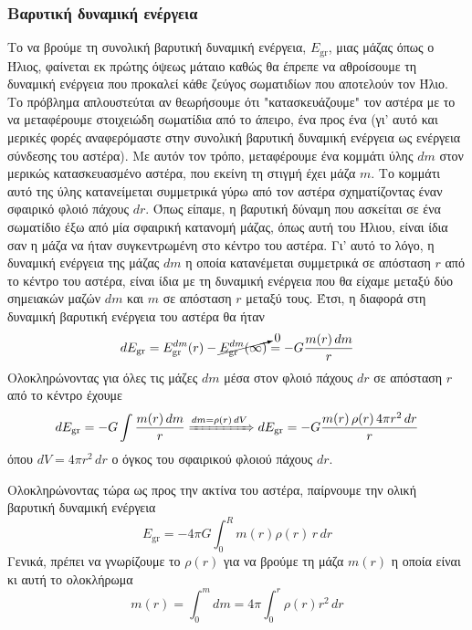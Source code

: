 \subsubsection{Βαρυτική δυναμική ενέργεια}
Το να βρούμε τη συνολική βαρυτική δυναμική ενέργεια, $E_{\text{gr}}$, μιας μάζας όπως ο Ήλιος, φαίνεται εκ πρώτης όψεως μάταιο καθώς θα έπρεπε να αθροίσουμε τη δυναμική ενέργεια που προκαλεί κάθε ζεύγος σωματιδίων που αποτελούν τον Ήλιο. Το πρόβλημα απλουστεύται αν θεωρήσουμε ότι "κατασκευάζουμε" τον αστέρα με το να μεταφέρουμε στοιχειώδη σωματίδια από το άπειρο, ένα προς ένα (γι' αυτό και μερικές φορές αναφερόμαστε στην συνολική βαρυτική δυναμική ενέργεια ως ενέργεια σύνδεσης του αστέρα). Με αυτόν τον τρόπο, μεταφέρουμε ένα κομμάτι ύλης $dm$ στον μερικώς κατασκευασμένο αστέρα, που εκείνη τη στιγμή έχει μάζα $m$. Το κομμάτι αυτό της ύλης κατανείμεται συμμετρικά γύρω από τον αστέρα σχηματίζοντας έναν σφαιρικό φλοιό πάχους $dr$. Όπως είπαμε, η βαρυτική δύναμη που ασκείται σε ένα σωματίδιο έξω από μία σφαιρική κατανομή μάζας, όπως αυτή του Ήλιου, είναι ίδια σαν η μάζα να ήταν συγκεντρωμένη στο κέντρο του αστέρα. Γι' αυτό το λόγο, η δυναμική ενέργεια της μάζας $dm$ η οποία κατανέμεται συμμετρικά σε απόσταση $r$ από το κέντρο του αστέρα, είναι ίδια με τη δυναμική ενέργεια που θα είχαμε μεταξύ δύο σημειακών μαζών $dm$ και $m$ σε απόσταση $r$ μεταξύ τους. Έτσι, η διαφορά στη δυναμική βαρυτική ενέργεια του αστέρα θα ήταν
\begin{equation}
    dE_{\text{gr}} = E_{\text{gr}}^{dm}(r) - \cancelto{0}{E_{\text{gr}}^{dm}(\infty)} = - G \frac{m(r) \, dm}{r} 
\end{equation}
Ολοκληρώνοντας για όλες τις μάζες $dm$ μέσα στον φλοιό πάχους $dr$ σε απόσταση $r$ από το κέντρο έχουμε
\begin{equation}
    dE_{\text{gr}} = -G \int \frac{m(r) \,dm}{r} \xRightarrow{dm = \rho(r) \,dV} dE_{\text{gr}} = - G \frac{m(r) \,\rho(r) \, 4\pi r^2 \,dr}{r}
\end{equation}
όπου $dV = 4\pi r^2 \,dr$ ο όγκος του σφαιρικού φλοιού πάχους $dr$.

Ολοκληρώνοντας τώρα ως προς την ακτίνα του αστέρα, παίρνουμε την ολική βαρυτική δυναμική ενέργεια
\begin{equation}
    E_{\text{gr}} = -4\pi G \int_{0}^{R} m(r) \rho(r) \,r \,dr
\end{equation}
Γενικά, πρέπει να γνωρίζουμε το $\rho(r)$ για να βρούμε τη μάζα $m(r)$ η οποία είναι κι αυτή το ολοκλήρωμα
$$m(r) = \int_{0}^{m} dm = 4 \pi \int_{0}^{r} \rho(r) r^2 \,dr$$

